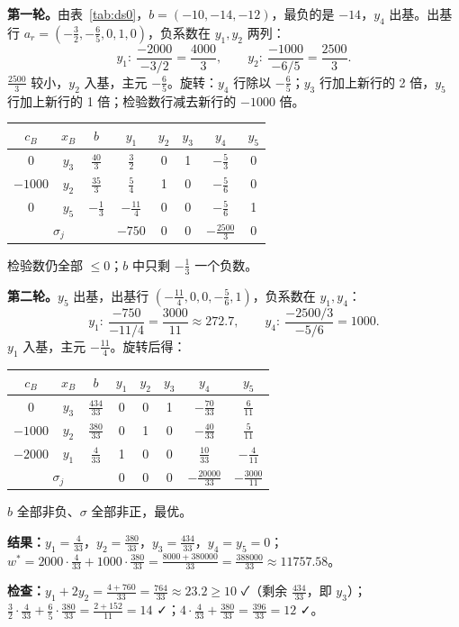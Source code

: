 \begin{examplebox}
\textbf{第一轮。}由表~\ref{tab:ds0}，$b=(-10,-14,-12)$，最负的是 $-14$，$y_4$ 出基。出基行 $a_r=(-\frac32,-\frac65,0,1,0)$，负系数在 $y_1,y_2$ 两列：
\[
y_1:\ \frac{-2000}{-3/2}=\frac{4000}{3},\qquad y_2:\ \frac{-1000}{-6/5}=\frac{2500}{3}.
\]
$\frac{2500}{3}$ 较小，$y_2$ 入基，主元 $-\frac65$。旋转：$y_4$ 行除以 $-\frac65$；$y_3$ 行加上新行的 2 倍，$y_5$ 行加上新行的 1 倍；检验数行减去新行的 $-1000$ 倍。

\begin{center}\small
\begin{tabular}{@{}ccc|ccccc@{}}
\toprule
$c_B$ & $x_B$ & $b$ & $y_1$ & $y_2$ & $y_3$ & $y_4$ & $y_5$\\\midrule
0 & $y_3$ & $\frac{40}{3}$ & $\frac32$ & 0 & 1 & $-\frac53$ & 0\\
$-1000$ & $y_2$ & $\frac{35}{3}$ & $\frac54$ & 1 & 0 & $-\frac56$ & 0\\
0 & $y_5$ & \cellcolor{lightred}$-\frac13$ & $-\frac{11}{4}$ & 0 & 0 & $-\frac56$ & 1\\\midrule
\multicolumn{3}{c|}{$\sigma_j$} & $-750$ & 0 & 0 & $-\frac{2500}{3}$ & 0\\\bottomrule
\end{tabular}
\end{center}
检验数仍全部 $\le0$；$b$ 中只剩 $-\frac13$ 一个负数。

\textbf{第二轮。}$y_5$ 出基，出基行 $(-\frac{11}{4},0,0,-\frac56,1)$，负系数在 $y_1,y_4$：
\[
y_1:\ \frac{-750}{-11/4}=\frac{3000}{11}\approx272.7,\qquad y_4:\ \frac{-2500/3}{-5/6}=1000 .
\]
$y_1$ 入基，主元 $-\frac{11}{4}$。旋转后得：

\begin{center}\small
\begin{tabular}{@{}ccc|ccccc@{}}
\toprule
$c_B$ & $x_B$ & $b$ & $y_1$ & $y_2$ & $y_3$ & $y_4$ & $y_5$\\\midrule
0 & $y_3$ & $\frac{434}{33}$ & 0 & 0 & 1 & $-\frac{70}{33}$ & $\frac{6}{11}$\\
$-1000$ & $y_2$ & $\frac{380}{33}$ & 0 & 1 & 0 & $-\frac{40}{33}$ & $\frac{5}{11}$\\
$-2000$ & $y_1$ & $\frac{4}{33}$ & 1 & 0 & 0 & $\frac{10}{33}$ & $-\frac{4}{11}$\\\midrule
\multicolumn{3}{c|}{$\sigma_j$} & 0 & 0 & 0 & $-\frac{20000}{33}$ & $-\frac{3000}{11}$\\\bottomrule
\end{tabular}
\end{center}
$b$ 全部非负、$\sigma$ 全部非正，最优。\par
\textbf{结果：}$y_1=\frac{4}{33}$，$y_2=\frac{380}{33}$，$y_3=\frac{434}{33}$，$y_4=y_5=0$；$w^*=2000\cdot\frac{4}{33}+1000\cdot\frac{380}{33}=\frac{8000+380000}{33}=\frac{388000}{33}\approx11757.58$。\par
\textbf{检查：}$y_1+2y_2=\frac{4+760}{33}=\frac{764}{33}\approx23.2\ge10$ ✓（剩余 $\frac{434}{33}$，即 $y_3$）；$\frac32\cdot\frac{4}{33}+\frac65\cdot\frac{380}{33}=\frac{2+152}{11}=14$ ✓；$4\cdot\frac4{33}+\frac{380}{33}=\frac{396}{33}=12$ ✓。
\end{examplebox}

